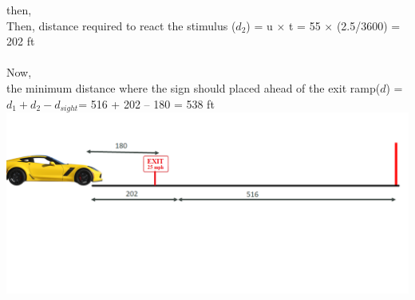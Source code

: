 then,\\
Then,
distance required to react the stimulus ($ d_2 $) = u $ \times $ t = 55 $ \times $ (2.5/3600) = 202 ft\\\\
Now,\\
the minimum distance where the sign should placed ahead of the exit ramp($ d $) = $ d_1 + d_2 - d_{sight} $= 516 + 202 – 180 = 538 ft\\
\includegraphics[scale=0.3]{gfx/visualAquityNum.png}
\newpage
